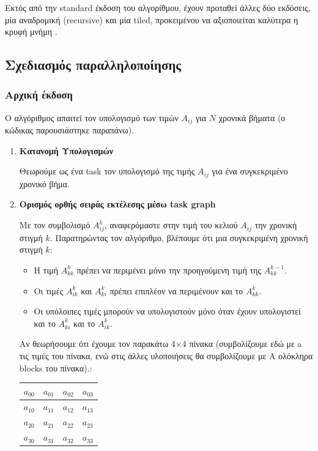\documentclass{article}
\begin{document}
Εκτός από την standard έκδοση του αλγορίθμου, έχουν προταθεί άλλες δύο εκδόσεις, μία αναδρομική (recursive) και μία tiled, προκειμένου να αξιοποιείται καλύτερα η κρυφή μνήμη \cite{park2004optimizing}. 

\subsection{Σχεδιασμός παραλληλοποίησης}

\subsubsection{Αρχική έκδοση}
Ο αλγόριθμος απαιτεί τον υπολογισμό των τιμών $A_{ij}$ για $N$ χρονικά βήματα (ο κώδικας παρουσιάστηκε παραπάνω). 

\begin{enumerate}
\item \textbf{Κατανομή Υπολογισμών}

Θεωρούμε ως ένα task τον υπολογισμό της τιμής $A_{ij}$ για ένα συγκεκριμένο χρονικό βήμα.

\item \textbf{Ορισμός ορθής σειράς εκτέλεσης μέσω task graph}

Με τον συμβολισμό $A_{ij}^{k}$, αναφερόμαστε στην τιμή του κελιού $A_{ij}$ την χρονική στιγμή $k$. Παρατηρώντας τον αλγόριθμο, βλέπουμε ότι μια συγκεκριμένη χρονική στιγμή $k$:
\begin{itemize}
\item Η τιμή $A_{kk}^{k}$ πρέπει να περιμένει μόνο την προηγούμενη τιμή της $A_{kk}^{k-1}$.
\item Οι τιμές $A_{ik}^{k}$ και $A_{ki}^{k}$ πρέπει επιπλέον να περιμένουν και το $A_{kk}^{k}$.
\item Οι υπόλοιπες τιμές μπορούν να υπολογιστούν μόνο όταν έχουν υπολογιστεί και το $A_{ki}^{k}$ και το $A_{ik}^{k}$.
\end{itemize}

Αν θεωρήσουμε ότι έχουμε τον παρακάτω 4×4 πίνακα (συμβολίζουμε εδώ με a τις τιμές του πίνακα, ενώ στις άλλες υλοποιήσεις θα συμβολίζουμε με A ολόκληρα blocks του πίνακα).:

\begin{center}
 \begin{tabular}{|c | c | c | c|} 
 \hline
  $a_{00}$ & $a_{01}$ & $a_{02}$ & $a_{03}$ \\
 \hline
 $a_{10}$ & $a_{11}$ & $a_{12}$ & $a_{13}$ \\
 \hline
 $a_{20}$ & $a_{21}$ & $a_{22}$ & $a_{23}$ \\ 
 \hline
 $a_{30}$ & $a_{31}$ & $a_{32}$ & $a_{33}$ \\
 \hline
\end{tabular}
\end{center}


\end{enumerate}
\end{document}
